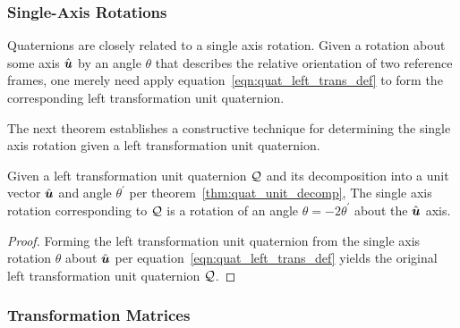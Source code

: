 \subsubsection{Single-Axis Rotations}

Quaternions are closely related to a single axis rotation.
Given a rotation about some axis $\hat{\boldsymbol{u}}$ by an angle $\theta$
that describes the relative orientation of two reference frames,
one merely need apply equation~\eqref{eqn:quat_left_trans_def}
to form the corresponding left transformation unit quaternion.

The next theorem establishes a constructive technique for determining
the single axis rotation given a left transformation unit quaternion.
\begin{theorem}\label{thm:quat_left_trans_to_rot}
Given a left transformation unit quaternion $\mathcal{Q}$
and its decomposition into a unit vector $\hat{\boldsymbol{u}}$ and angle $\theta^\prime$
per theorem~\ref{thm:quat_unit_decomp},
The single axis rotation corresponding
to $\mathcal{Q}$ is a rotation of an angle $\theta = -2 \theta^\prime$
about the $\hat{\boldsymbol{u}}$ axis.
\end{theorem}
\begin{proof}
Forming the left transformation unit quaternion from the single axis rotation
$\theta$ about $\hat{\boldsymbol{u}}$ per equation~\eqref{eqn:quat_left_trans_def} yields
the original left transformation unit quaternion $\mathcal{Q}$.
\end{proof}

\subsubsection{Transformation Matrices}\label{sec:app_to_mat}


